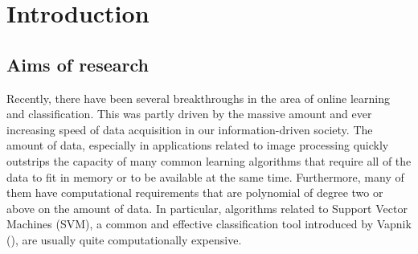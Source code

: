 

\chapter{Introduction}

\ifpdf
    \graphicspath{{1_introduction/figures/PNG/}{1_introduction/figures/PDF/}{1_introduction/figures/}}
\else
    \graphicspath{{1_introduction/figures/EPS/}{1_introduction/figures/}}
\fi







\section{Aims of research} %
Recently, there have been several breakthroughs in the area of online learning and classification. This was partly driven by the massive amount and ever increasing speed of data acquisition in our information-driven society. The amount of data, especially in applications related to image processing quickly outstrips the capacity of many common learning algorithms that require all of the data to fit in memory or to be available at the same time. Furthermore, many of them have computational requirements that are polynomial of degree two or above on the amount of data. In particular, algorithms related to Support Vector Machines (SVM), a common and effective classification tool introduced by Vapnik (\cite{Vapnik95}), are usually quite computationally expensive.

